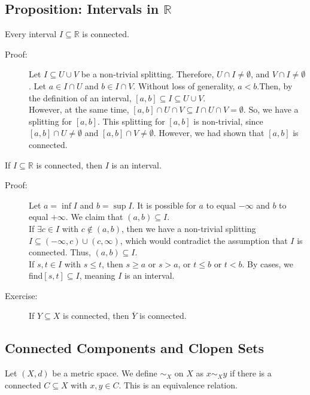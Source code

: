 \documentclass[10pt]{extarticle}
\newcommand{\R}{\mathbb{R}}
\begin{document}
  \subsection{Proposition: Intervals in $\R$}%
  Every interval $I\subseteq \R$ is connected.
  \begin{description}
    \item[Proof:] Let $I\subseteq U\cup V$ be a non-trivial splitting. Therefore, $U\cap I \neq \emptyset$, and $V\cap I \neq \emptyset$. Let $a\in I\cap U$ and $b\in I\cap V$. Without loss of generality, $a < b$.Then, by the definition of an interval, $[a,b]\subseteq I\subseteq U\cup V$.\\

      However, at the same time, $[a,b]\cap U\cap V \subseteq I\cap U \cap V = \emptyset$. So, we have a splitting for $[a,b]$. This splitting for $[a,b]$ is non-trivial, since $[a,b]\cap U \neq \emptyset$ and $[a,b]\cap V \neq \emptyset$. However, we had shown that $[a,b]$ is connected.
  \end{description}
  If $I\subseteq \R$ is connected, then $I$ is an interval.
  \begin{description}
    \item[Proof:] Let $a = \inf I$ and $b = \sup I$. It is possible for $a$ to equal $-\infty$ and $b$ to equal $+\infty$. We claim that $(a,b)\subseteq I$.\\

      If $\exists c\in I$ with $c\notin (a,b)$, then we have a non-trivial splitting $I\subseteq (-\infty,c)\cup (c,\infty)$, which would contradict the assumption that $I$ is connected. Thus, $(a,b)\subseteq I$.\\

      If $s,t\in I$ with $s \leq t$, then $s\geq a$ or $s > a$, or $t\leq b$ or $t < b$. By cases, we find$[s,t]\subseteq I$, meaning $I$ is an interval.
    \item[Exercise:] If $Y\subseteq X$ is connected, then $\overline{Y}$ is connected.
  \end{description}
  \subsection{Connected Components and Clopen Sets}%
  Let $(X,d)$ be a metric space. We define $\sim_{X}$ on $X$ as $x\sim_{X}y$ if there is a connected $C\subseteq X$ with $x,y\in C$. This is an equivalence relation.\\
\end{document}

